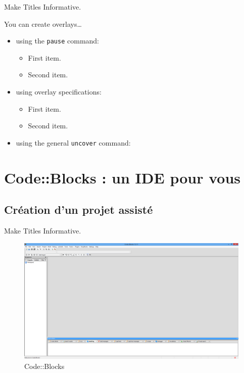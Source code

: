 \documentclass{beamer}
\begin{document}
\begin{frame}{Make Titles Informative.}

  You can create overlays\dots
  \begin{itemize}
  \item using the \texttt{pause} command:
    \begin{itemize}
    \item
      First item.
      \pause
    \item    
      Second item.
    \end{itemize}
  \item
    using overlay specifications:
    \begin{itemize}
    \item<3->
      First item.
    \item<4->
      Second item.
    \end{itemize}
  \item
    using the general \texttt{uncover} command:
    \begin{itemize}
    \end{itemize}
  \end{itemize}
\end{frame}



\section{Code::Blocks : un IDE pour vous}

\subsection{Création d'un projet assisté}

\begin{frame}{Make Titles Informative.}
\begin{figure}
\includegraphics[scale=0.3]{../images/cb01.png}
\caption{Code::Blocks}				
\label{cb01}				
\end{figure}
\end{frame}
\end{document}
